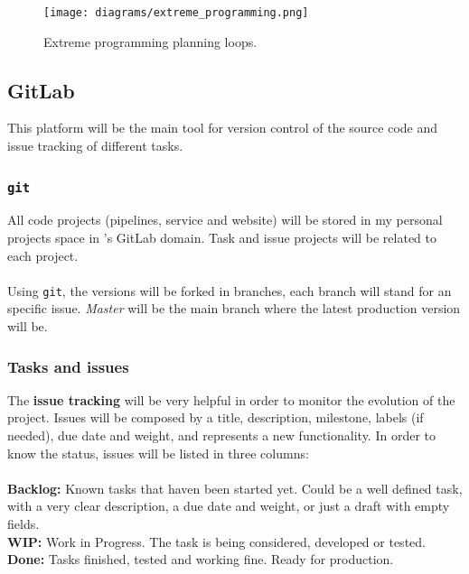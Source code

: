 \begin{figure}[H]
\centering
\texttt{[image: diagrams/extreme\_programming.png]}
\caption{Extreme programming planning loops.}
\end{figure}

\subsection{GitLab}

This platform will be the main tool for version control of the source code and issue tracking of different tasks.

\subsubsection*{\texttt{git}}

All code projects (pipelines, service and website) will be stored in my personal projects space in \company's GitLab domain. Task and issue projects will be related to each project.
\\\\
Using \texttt{git}, the versions will be forked in branches, each branch will stand for an specific issue. \textit{Master} will be the main branch where the latest production version will be.

\subsubsection*{Tasks and issues}

The \textbf{issue tracking} will be very helpful in order to monitor the evolution of the project. Issues will be composed by a title, description, milestone, labels (if needed), due date and weight, and represents a new functionality. In order to know the status, issues will be listed in three columns:
\\\\
\textbf{Backlog:} Known tasks that haven been started yet. Could be a well defined task, with a very clear description, a due date and weight, or just a draft with empty fields.
\\
\textbf{WIP:} Work in Progress. The task is being considered, developed or tested.
\\
\textbf{Done:} Tasks finished, tested and working fine. Ready for production.
